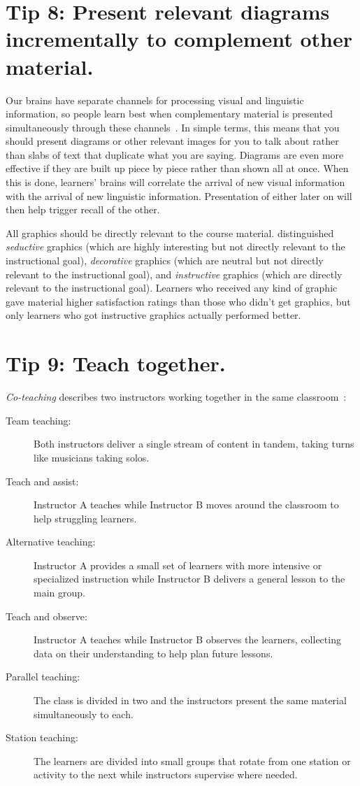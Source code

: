\documentclass[10pt,letterpaper]{article}
\newcommand{\rulemajor}[1]{\section{#1}}
\begin{document}
\rulemajor{Tip 8: Present relevant diagrams incrementally to complement other material.}

Our brains have separate channels for
processing visual and linguistic information,
so people learn best when complementary material is presented simultaneously through these channels~\cite{Maye2003,Maye2009}.
In simple terms,
this means that you should present diagrams or other relevant images for you to talk about
rather than slabs of text that duplicate what you are saying.
Diagrams are even more effective if they are built up piece by piece rather than shown all at once.
When this is done,
learners' brains will correlate the arrival of new visual information
with the arrival of new linguistic information.
Presentation of either later on will then help trigger recall of the other.

All graphics should be directly relevant to the course material.
\cite{Sung2012} distinguished \emph{seductive} graphics
(which are highly interesting but not directly relevant to the instructional goal),
\emph{decorative} graphics
(which are neutral but not directly relevant to the instructional goal),
and \emph{instructive} graphics
(which are directly relevant to the instructional goal).
Learners who received any kind of graphic gave material higher satisfaction ratings
than those who didn't get graphics,
but only learners who got instructive graphics actually performed better.

\rulemajor{Tip 9: Teach together.}

\emph{Co-teaching} describes two instructors working together in the same classroom~\cite{Frie2016}:

\begin{description}

\item[Team teaching:]
  Both instructors deliver a single stream of content in tandem,
  taking turns like musicians taking solos.

\item[Teach and assist:]
  Instructor A teaches while Instructor B moves around the classroom
  to help struggling learners.

\item[Alternative teaching:]
  Instructor A provides a small set of learners with more intensive or specialized instruction
  while Instructor B delivers a general lesson to the main group.

\item[Teach and observe:]
  Instructor A teaches while Instructor B observes the learners,
  collecting data on their understanding to help plan future lessons.

\item[Parallel teaching:]
  The class is divided in two
  and the instructors present the same material simultaneously to each.

\item[Station teaching:]
  The learners are divided into small groups
  that rotate from one station or activity to the next
  while instructors supervise where needed.

\end{description}
\end{document}
